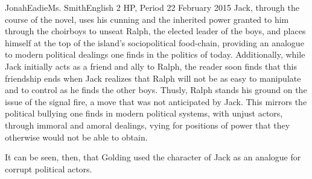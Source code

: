 \documentclass[12pt,letterpaper]{article}
\begin{document}
\begin{mla}{Jonah}{Eadie}{Ms. Smith}{English 2 HP, Period 2}{2 February 2015}
Jack, through the course of the novel, uses his cunning and the inherited 
power granted to him through the choirboys to unseat Ralph, the elected leader 
of the boys, and places himself at the top of the island's sociopolitical 
food-chain, providing an analogue to modern political dealings one finds in the 
politics of today. Additionally, while Jack initially acts as a friend and ally 
to Ralph, the reader soon finds that this friendship ends when Jack realizes 
that Ralph will not be as easy to manipulate and to control as he finds the 
other boys. Thusly, Ralph stands his ground on the issue of the signal fire, a 
move that was not anticipated by Jack. This mirrors the political bullying one 
finds in modern political systems, with unjust actors, through immoral and 
amoral dealings, vying for positions of power that they otherwise would not be 
able to obtain.

It can be seen, then, that Golding used the character of Jack as an analogue 
for corrupt political actors.


\end{mla}
\end{document}
